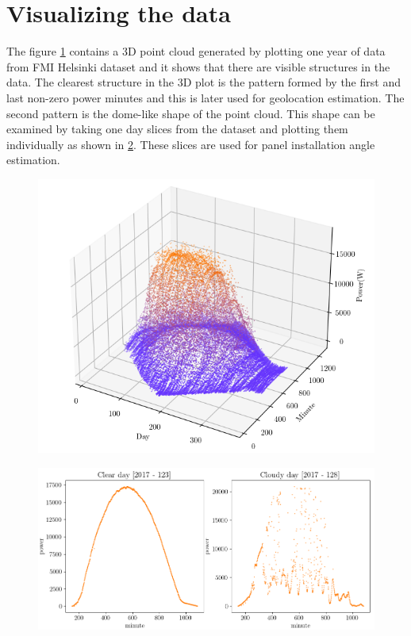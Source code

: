 \section{Visualizing the data}
The figure \ref{fig_oneyear_pointcloud} contains a 3D point cloud generated by plotting one year of data from FMI Helsinki dataset and it shows that there are visible structures in the data. The clearest structure in the 3D plot is the pattern formed by the first and last non-zero power minutes and this is later used for geolocation estimation. The second pattern is the dome-like shape of the point cloud. This shape can be examined by taking one day slices from the dataset and plotting them individually as shown in \ref{fig_cloudfree_vs_cloudy}. These slices are used for panel installation angle estimation.

\begin{figure}[h]
\centering
\includegraphics[width=0.8\linewidth]{pics/oneyear2}
\label{fig_oneyear_pointcloud}
\end{figure}

\newpage
\begin{figure}[h!]
\centering
\includegraphics[width=1\linewidth]{pics/cloudfree_vs_cloudy}
\label{fig_cloudfree_vs_cloudy}
\end{figure}

